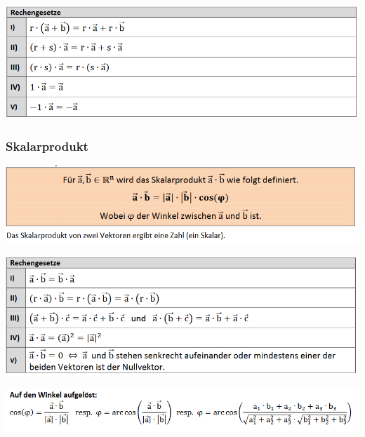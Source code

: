 \includegraphics[scale=0.7]{vec3-2.PNG}

\subsubsection{Skalarprodukt}
\includegraphics[scale=0.7]{vec4.PNG}

\includegraphics[scale=0.7]{vec4-1.PNG}

\includegraphics[scale=0.7]{vec4-2.PNG}

